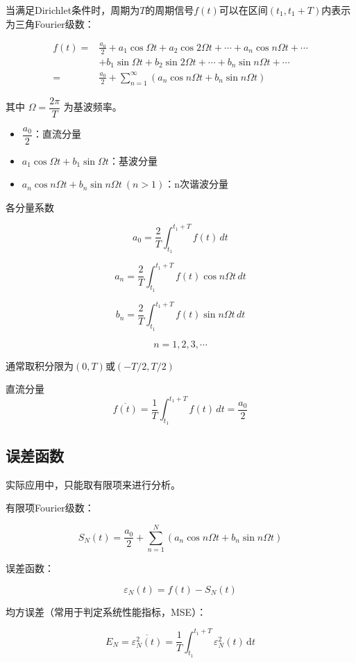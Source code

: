 \documentclass[UTF8]{ctexart}
\begin{document}
当满足Dirichlet条件时，周期为$T$的周期信号$f(t)$可以在区间$ (t_1, t_1+T)$内表示为三角Fourier级数：

$$
\begin{aligned}
f(t) =& \frac{a_0}{2} + a_1 \cos \Omega t + a_2 \cos 2\Omega t + \cdots + a_n \cos n\Omega t + \cdots \\
&+ b_1 \sin \Omega t + b_2 \sin 2\Omega t + \cdots + b_n \sin n\Omega t + \cdots \\
=& \frac{a_0}{2} + \sum_{n=1}^{\infty} \left( a_n \cos n\Omega t + b_n \sin n\Omega t \right)
\end{aligned}
$$

其中 $\Omega = \dfrac{2\pi}{T}$ 为基波频率。

\begin{itemize}
    \item $\dfrac{a_0}{2}$：直流分量
    \item $a_1 \cos \Omega t + b_1 \sin \Omega t$：基波分量
    \item $a_n \cos n\Omega t + b_n \sin n\Omega t \ (n>1)$：n次谐波分量
\end{itemize}

各分量系数

$$
a_0 = \frac{2}{T} \int_{t_1}^{t_1+T} f(t)\,dt
$$

$$
a_n = \frac{2}{T} \int_{t_1}^{t_1+T} f(t) \cos n\Omega t\,dt
$$

$$
b_n = \frac{2}{T} \int_{t_1}^{t_1+T} f(t) \sin n\Omega t\,dt
$$

$$
n = 1,2,3,\cdots
$$

通常取积分限为$(0,T)$或$(-T/2,T/2)$

直流分量
$$
\overline{f(t)} = \frac{1}{T} \int_{t_1}^{t_1+T} f(t)\,dt = \frac{a_0}{2}
$$

\subsection{误差函数}

实际应用中，只能取有限项来进行分析。

有限项Fourier级数：

$$
S_N(t) = \frac{a_0}{2} + \sum_{n=1}^{N} \left( a_n \cos n\Omega t + b_n \sin n\Omega t \right)
$$

误差函数：

$$
\varepsilon_N(t) = f(t) - S_N(t)
$$

均方误差（常用于判定系统性能指标，MSE）：

$$
E_N = \overline{\varepsilon_N^2(t)} = \frac{1}{T} \int_{t_1}^{t_1+T} \varepsilon_N^2(t) \,\mathrm{d}t
$$
\end{document}
